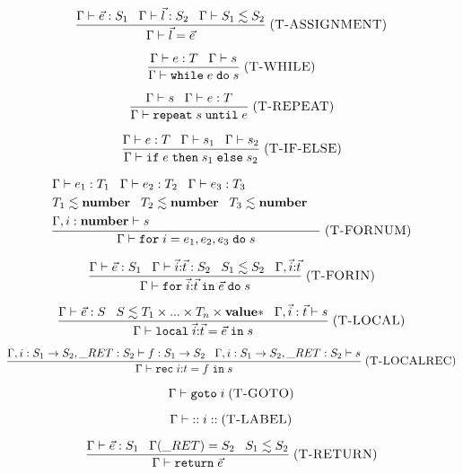 \documentclass[12pt]{article}
\newcommand{\Top}{\mathbf{value}}
\newcommand{\Number}{\mathbf{number}}
\newcommand{\kw}[1]{\mathbf{\texttt{#1}}}
\newcommand{\mylabel}[1]{\; (\textsc{#1})}
\newcommand{\env}{\Gamma}
\newcommand{\ret}{\string_RET}
\begin{document}
\[
\frac{\env \vdash \vec{e}:S_{1} \;\;\;
      \env \vdash \vec{l}:S_{2} \;\;\;
      \env \vdash S_{1} \lesssim S_{2}}
     {\env \vdash \vec{l} = \vec{e}}
\mylabel{T-ASSIGNMENT}
\]

\[
\frac{\env \vdash e:T \;\;\;
      \env \vdash s}
     {\env \vdash \kw{while} \; e \; \kw{do} \; s}
\mylabel{T-WHILE}
\]

\[
\frac{\env \vdash s \;\;\;
      \env \vdash e:T}
     {\env \vdash \kw{repeat} \; s \; \kw{until} \; e}
\mylabel{T-REPEAT}
\]

\[
\frac{\env \vdash e:T \;\;\;
      \env \vdash s_{1} \;\;\;
      \env \vdash s_{2}}
     {\env \vdash \kw{if} \; e \; \kw{then} \; s_{1} \; \kw{else} \; s_{2}}
\mylabel{T-IF-ELSE}
\]

\[
\frac{\begin{aligned}
      & \env \vdash e_{1}:T_{1} \;\;\;
        \env \vdash e_{2}:T_{2} \;\;\;
        \env \vdash e_{3}:T_{3} & \\
      & T_{1} \lesssim \Number \;\;\;
        T_{2} \lesssim \Number \;\;\;
        T_{3} \lesssim \Number & \\
      & \env, i:\Number \vdash s &
      \end{aligned}}
     {\env \vdash \kw{for} \; i = e_{1},e_{2},e_{3} \; \kw{do} \; s}
\mylabel{T-FORNUM}
\]

\[
\frac{\env \vdash \vec{e}:S_{1} \;\;\;
      \env \vdash \vec{i}{:}\vec{t}:S_{2} \;\;\;
      S_{1} \lesssim S_{2} \;\;\;
      \env, \vec{i}{:}\vec{t}}
     {\env \vdash \kw{for} \; \vec{i}{:}\vec{t} \; \kw{in} \; \vec{e} \; \kw{do} \; s}
\mylabel{T-FORIN}
\]

\[
\frac{\env \vdash \vec{e}:S \;\;\;
      S \lesssim T_{1} \times {...} \times T_{n} \times \Top{*} \;\;\;
      \env, \vec{i}:\vec{t} \vdash s}
     {\env \vdash \kw{local} \; \vec{i}{:}\vec{t} = \vec{e} \; \kw{in} \; s}
\mylabel{T-LOCAL}
\]

\[
\frac{\env, i:S_{1} \rightarrow S_{2}, \ret:S_{2} \vdash f:S_{1} \rightarrow S_{2} \;\;\;
      \env, i:S_{1} \rightarrow S_{2}, \ret:S_{2} \vdash s}
     {\env \vdash \kw{rec} \; i{:}t = f \; \kw{in} \; s}
\mylabel{T-LOCALREC}
\]

\[
\env \vdash \kw{goto} \; i
\mylabel{T-GOTO}
\]

\[
\env \vdash {::} \; i \; {::}
\mylabel{T-LABEL}
\]

\[
\frac{\env \vdash \vec{e}:S_{1} \;\;\;
      \env(\ret) = S_{2} \;\;\;
      S_{1} \lesssim S_{2}}
     {\env \vdash \kw{return} \; \vec{e}}
\mylabel{T-RETURN}
\]
\end{document}
